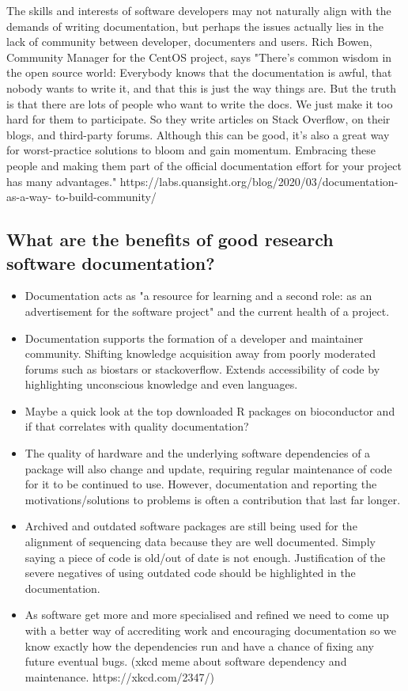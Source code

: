 \documentclass[../main.tex]{subfiles}
\begin{document}
The skills and interests of software developers may not naturally align with the demands of writing documentation, but perhaps the issues actually lies in the lack of community between developer, documenters and users.
Rich Bowen, Community Manager for the CentOS project,  says "There’s common wisdom in the open source world: Everybody knows that the documentation is awful, that nobody wants to write it, and that this is just the way things are. But the truth is that there are lots of people who want to write the docs. We just make it too hard for them to participate. So they write articles on Stack Overflow, on their blogs, and third-party forums. Although this can be good, it’s also a great way for worst-practice solutions to bloom and gain momentum. Embracing these people and making them part of the official documentation effort for your project has many advantages." https://labs.quansight.org/blog/2020/03/documentation-as-a-way- to-build-community/

\subsection{What are the benefits of good research software documentation?}
\begin{itemize}
    \item Documentation acts as "a resource for learning and a second role: as an advertisement for the software project" and the current health of a project.\cite{Geiger2018}
    \item Documentation supports the formation of a developer and maintainer community. Shifting knowledge acquisition away from poorly moderated forums such as biostars or stackoverflow. Extends accessibility of code by highlighting unconscious knowledge and even languages.
    \item Maybe a quick look at the top downloaded R packages on bioconductor and if that correlates with quality documentation?
    \item The quality of hardware and the underlying software dependencies of a package will also change and update, requiring regular maintenance of code for it to be continued to use. However, documentation and reporting the motivations/solutions to problems is often a contribution that last far longer.
    \item Archived and outdated software packages are still being used for the alignment of sequencing data because they are well documented. Simply saying a piece of code is old/out of date is not enough. Justification of the severe negatives of using outdated code should be highlighted in the documentation.
    \item As software get more and more specialised and refined we need to come up with a better way of accrediting work and encouraging documentation so we know exactly how the dependencies run and have a chance of fixing any future eventual bugs. (xkcd meme about software dependency and maintenance. https://xkcd.com/2347/)
\end{itemize}
\end{document}
